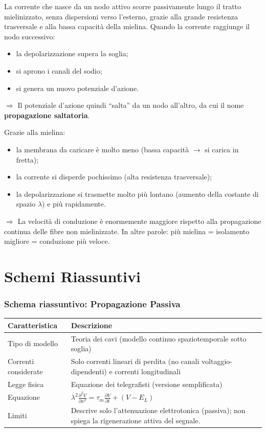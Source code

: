 La corrente che nasce da un nodo attivo scorre passivamente lungo il tratto mielinizzato, senza dispersioni verso l’esterno, grazie alla grande resistenza trasversale e alla bassa capacità della mielina.
Quando la corrente raggiunge il nodo successivo:
\begin{itemize}
  \item la depolarizzazione supera la soglia;
  \item si aprono i canali del sodio;
  \item si genera un nuovo potenziale d’azione.
\end{itemize}
$\Rightarrow$ Il potenziale d’azione quindi “salta” da un nodo all’altro, da cui il nome \textbf{propagazione saltatoria}.

Grazie alla mielina:
\begin{itemize}
  \item la membrana da caricare è molto meno (bassa capacità $\rightarrow$ si carica in fretta);
  \item la corrente si disperde pochissimo (alta resistenza trasversale);
  \item la depolarizzazione si trasmette molto più lontano (aumento della costante di spazio $\lambda$) e più rapidamente.
\end{itemize}
$\Rightarrow$ La velocità di conduzione è enormemente maggiore rispetto alla propagazione continua delle fibre non mielinizzate. In altre parole: più mielina = isolamento migliore = conduzione più veloce.

\clearpage
\section{Schemi Riassuntivi}

\subsubsection{Schema riassuntivo: Propagazione Passiva}
\begin{table}[H]
\centering
\renewcommand{\arraystretch}{1.5}
\begin{tabularx}{\textwidth}{l X}
\toprule
\textbf{Caratteristica} & \textbf{Descrizione} \\
\midrule
Tipo di modello & Teoria dei cavi (modello continuo spaziotemporale sotto soglia) \\
Correnti considerate & Solo correnti lineari di perdita (no canali voltaggio-dipendenti) e correnti longitudinali \\
Legge fisica & Equazione dei telegrafisti (versione semplificata) \\
Equazione & $\displaystyle \lambda^2 \frac{\partial^2 V}{\partial x^2} = \tau_m \frac{\partial V}{\partial t} + (V - E_L)$ \\
Limiti & Descrive solo l’attenuazione elettrotonica (passiva); non spiega la rigenerazione attiva del segnale. \\
\bottomrule
\end{tabularx}
\end{table}

